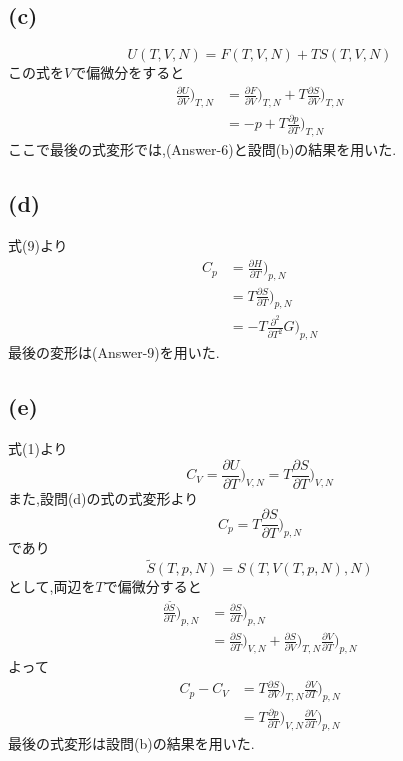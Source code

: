 \subsection*{(c)}
\[U(T,V,N) = F(T,V,N) + TS(T,V,N)\]
この式を$V$で偏微分をすると
\begin{align*}
\frac{\partial U}{\partial V}\bigg)_{T,N} 
&= \frac{\partial F}{\partial V}\bigg)_{T,N} + T \frac{\partial S}{\partial V}\bigg)_{T,N} \\
&=-p + T \frac{\partial p}{\partial T}\bigg)_{T,N}
\end{align*}
ここで最後の式変形では,(Answer-6)と設問(b)の結果を用いた.

\subsection*{(d)}
式(9)より
\begin{align*}
C_p
& = \frac{\partial H}{\partial T}\bigg)_{p,N} \\
& = T \frac{\partial S}{\partial T}\bigg)_{p,N} \\
& = - T \frac{\partial^2}{\partial T^2} G \bigg)_{p,N}
\end{align*}
最後の変形は(Answer-9)を用いた.

\subsection*{(e)}
式(1)より
\[C_V = \frac{\partial U}{\partial T}\bigg)_{V,N} = T \frac{\partial S}{\partial T}\bigg)_{V,N}  \]
また,設問(d)の式の式変形より
\[C_p = T \frac{\partial S}{\partial T}\bigg)_{p,N}\]
であり
\[\tilde{S} (T,p,N) =  S(T,V(T,p,N),N)\]
として,両辺を$T$で偏微分すると
\begin{align*}
  \frac{\partial \tilde{S}}{\partial T}\bigg)_{p,N} 
  &= \frac{\partial S}{\partial T}\bigg)_{p,N}\\
  &= \frac{\partial S}{\partial T}\bigg)_{V,N} + \frac{\partial S}{\partial V}\bigg)_{T,N} \frac{\partial V}{\partial T}\bigg)_{p,N}
\end{align*}
よって
\begin{align*}
C_p - C_V 
&=T \frac{\partial S}{\partial V}\bigg)_{T,N} \frac{\partial V}{\partial T}\bigg)_{p,N}\\
&=T \frac{\partial p}{\partial T}\bigg)_{V,N} \frac{\partial V}{\partial T}\bigg)_{p,N}
\end{align*}
最後の式変形は設問(b)の結果を用いた.

